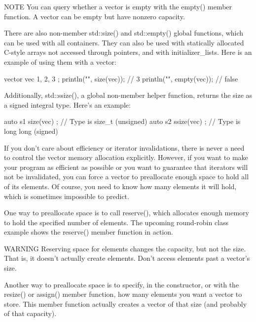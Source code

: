 \begin{myNotic}{NOTE}
You can query whether a vector is empty with the empty() member function. A vector can be empty but have nonzero capacity.
\end{myNotic}

There are also non-member std::size() and std::empty() global functions, which can be used with all containers. They can also be used with statically allocated C-style arrays not accessed through pointers, and with initializer\_lists. Here is an example of using them with a vector:

\begin{cpp}
vector vec { 1, 2, 3 };
println("{}", size(vec)); // 3
println("{}", empty(vec)); // false
\end{cpp}

Additionally, std::ssize(), a global non-member helper function, returns the size as a signed integral type. Here’s an example:

\begin{cpp}
auto s1 { size(vec) }; // Type is size_t (unsigned)
auto s2 { ssize(vec) }; // Type is long long (signed)
\end{cpp}


If you don’t care about efficiency or iterator invalidations, there is never a need to control the vector memory allocation explicitly. However, if you want to make your program as efficient as possible or you want to guarantee that iterators will not be invalidated, you can force a vector to preallocate enough space to hold all of its elements. Of course, you need to know how many elements it will hold, which is sometimes impossible to predict.

One way to preallocate space is to call reserve(), which allocates enough memory to hold the specified number of elements. The upcoming round-robin class example shows the reserve() member function in action.

\begin{myWarning}{WARNING}
Reserving space for elements changes the capacity, but not the size. That is, it doesn’t actually create elements. Don’t access elements past a vector’s size.
\end{myWarning}

Another way to preallocate space is to specify, in the constructor, or with the resize() or assign() member function, how many elements you want a vector to store. This member function actually creates a vector of that size (and probably of that capacity).

